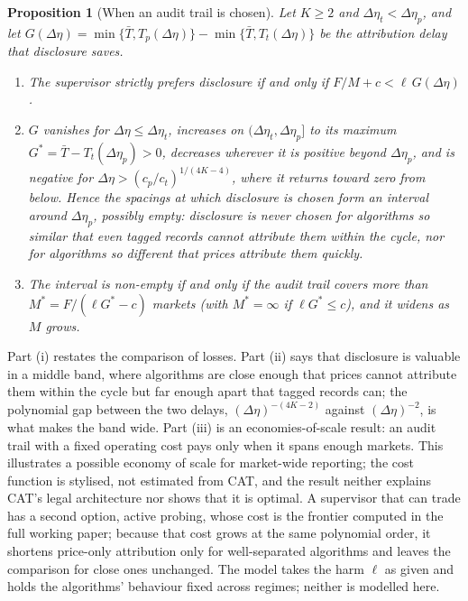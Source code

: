 \documentclass[12pt]{article}
\newtheorem{proposition}[theorem]{Proposition}
\theoremstyle{definition}
\theoremstyle{remark}
\begin{document}
\begin{proposition}[When an audit trail is chosen]\label{prop:choice}
Let $K\ge2$ and $\Delta\eta_t<\Delta\eta_p$, and let $G(\Delta\eta)=\min\{\bar T,T_p(\Delta\eta)\}-\min\{\bar T,T_t(\Delta\eta)\}$ be the attribution delay that disclosure saves.
\begin{enumerate}[label=(\roman*),itemsep=1pt]
\item The supervisor strictly prefers disclosure if and only if $F/M+c<\ell\,G(\Delta\eta)$.
\item $G$ vanishes for $\Delta\eta\le\Delta\eta_t$, increases on $(\Delta\eta_t,\Delta\eta_p]$ to its maximum $G^*=\bar T-T_t(\Delta\eta_p)>0$, decreases wherever it is positive beyond $\Delta\eta_p$, and is negative for $\Delta\eta>(c_p/c_t)^{1/(4K-4)}$, where it returns toward zero from below. Hence the spacings at which disclosure is chosen form an interval around $\Delta\eta_p$, possibly empty: disclosure is never chosen for algorithms so similar that even tagged records cannot attribute them within the cycle, nor for algorithms so different that prices attribute them quickly.
\item The interval is non-empty if and only if the audit trail covers more than $M^*=F/(\ell G^*-c)$ markets (with $M^*=\infty$ if $\ell G^*\le c$), and it widens as $M$ grows.
\end{enumerate}
\end{proposition}

Part (i) restates the comparison of losses. Part (ii) says that disclosure is valuable in a middle band, where algorithms are close enough that prices cannot attribute them within the cycle but far enough apart that tagged records can; the polynomial gap between the two delays, $(\Delta\eta)^{-(4K-2)}$ against $(\Delta\eta)^{-2}$, is what makes the band wide. Part (iii) is an economies-of-scale result: an audit trail with a fixed operating cost pays only when it spans enough markets. This illustrates a possible economy of scale for market-wide reporting; the cost function is stylised, not estimated from CAT, and the result neither explains CAT's legal architecture nor shows that it is optimal. A supervisor that can trade has a second option, active probing, whose cost is the frontier computed in the full working paper; because that cost grows at the same polynomial order, it shortens price-only attribution only for well-separated algorithms and leaves the comparison for close ones unchanged. The model takes the harm $\ell$ as given and holds the algorithms' behaviour fixed across regimes; neither is modelled here.
\end{document}
